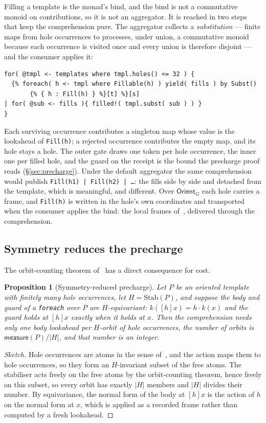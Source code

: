 \documentclass[11pt]{article}
\theoremstyle{branddef}
\theoremstyle{brandplain}
\newtheorem{proposition}[definition]{Proposition}
\theoremstyle{brandrem}
\newcommand{\meas}{\mathsf{measure}}
\newcommand{\Stab}{\mathrm{Stab}}
\newcommand{\fe}{\texttt{foreach}}
\begin{document}
Filling a template is the monad's bind, and the bind is not a commutative
monoid on contributions, so it is not an aggregator. It is reached in two
steps that keep the comprehension pure. The aggregator collects a
\emph{substitution} --- finite maps from hole occurrences to processes, under
union, a commutative monoid because each occurrence is visited once and every
union is therefore disjoint --- and the consumer applies it:
\begin{lstlisting}
for( @tmpl <- templates where tmpl.holes() <= 32 ) {
  {% foreach( h <- tmpl where Fillable(h) ) yield( fills ) by Subst()
       {% { h : Fill(h) } %}[t] %}[s]
| for( @sub <- fills ){ filled!( tmpl.subst( sub ) ) }
}
\end{lstlisting}
Each surviving occurrence contributes a singleton map whose value is the
lookahead of \texttt{Fill(h)}; a rejected occurrence contributes the empty map,
and its hole stays a hole. The outer gate draws one token per hole occurrence,
the inner one per filled hole, and the guard on the receipt is the bound the
precharge proof reads (\S\ref{sec:precharge}). Under the default aggregator the
same comprehension would publish \texttt{Fill(h1) | Fill(h2) | \dots}: the fills
side by side and detached from the template, which is meaningful, and
different. Over \(\mathsf{Orient}_G\) each hole carries a frame, and
\texttt{Fill(h)} is written in the hole's own coordinates and transported when
the consumer applies the bind: the local frames of~\cite{Oriented}, delivered
through the comprehension.

\subsection{Symmetry reduces the precharge}

The orbit-counting theorem of~\cite{Oriented} has a direct consequence for cost.

\begin{proposition}[Symmetry-reduced precharge]
\label{prop:symprecharge}
Let \(P\) be an oriented template with finitely many hole occurrences, let
\(H=\Stab(P)\), and suppose the body and guard of a \fe{} over \(P\) are
\(H\)-equivariant: \(k([h]x) = h\cdot k(x)\) and the guard holds at \([h]x\)
exactly when it holds at \(x\). Then the comprehension needs only one body
lookahead per \(H\)-orbit of hole occurrences, the number of orbits is
\(\meas(P)/|H|\), and that number is an integer.
\end{proposition}

\begin{proof}[Sketch]
Hole occurrences are atoms in the sense of~\cite{Oriented}, and the action maps
them to hole occurrences, so they form an \(H\)-invariant subset of the free
atoms. The stabiliser acts freely on the free atoms by the orbit-counting
theorem, hence freely on this subset, so every orbit has exactly \(|H|\)
members and \(|H|\) divides their number. By equivariance, the normal form of
the body at \([h]x\) is the action of \(h\) on the normal form at \(x\), which is
applied as a recorded frame rather than computed by a fresh lookahead.
\end{proof}
\end{document}
